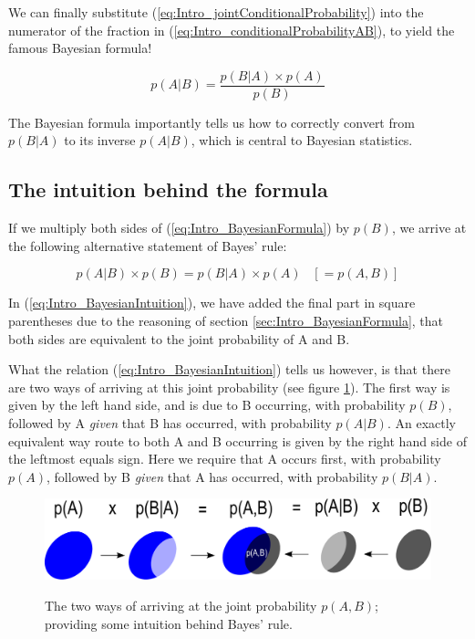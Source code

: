 \documentclass[11pt,fullpage]{book}
\begin{document}
We can finally substitute (\ref{eq:Intro_jointConditionalProbability}) into the numerator of the fraction in (\ref{eq:Intro_conditionalProbabilityAB}), to yield the famous Bayesian formula!

\begin{equation}\label{eq:Intro_BayesianFormula}
p(A|B) = \frac{p(B|A)\times p(A)}{p(B)}
\end{equation}

The Bayesian formula importantly tells us how to correctly convert from $p(B|A)$ to its inverse $p(A|B)$, which is central to Bayesian statistics.

\subsection{The intuition behind the formula}
If we multiply both sides of (\ref{eq:Intro_BayesianFormula}) by $p(B)$, we arrive at the following alternative statement of Bayes' rule:

\begin{equation}\label{eq:Intro_BayesianIntuition}
p(A|B)\times p(B) = p(B|A)\times p(A) \;\;\;[= p(A,B)]
\end{equation}

In (\ref{eq:Intro_BayesianIntuition}), we have added the final part in square parentheses due to the reasoning of section \ref{sec:Intro_BayesianFormula}, that both sides are equivalent to the joint probability of A and B.

What the relation (\ref{eq:Intro_BayesianIntuition}) tells us however, is that there are two ways of arriving at this joint probability (see figure \ref{fig:Intro_BayesianIntuition}). The first way is given by the left hand side, and is due to B occurring, with probability $p(B)$, followed by A \textit{given} that B has occurred, with probability $p(A|B)$. An exactly equivalent way route to both A and B occurring is given by the right hand side of the leftmost equals sign. Here we require that A occurs first, with probability $p(A)$, followed by B \textit{given} that A has occurred, with probability $p(B|A)$.

\begin{figure}
\centering
\scalebox{0.4} 
{\includegraphics{Intro_BayesianIntuition.pdf}}
\caption{The two ways of arriving at the joint probability $p(A,B)$; providing some intuition behind Bayes' rule.}\label{fig:Intro_BayesianIntuition}
\end{figure}
\end{document}
